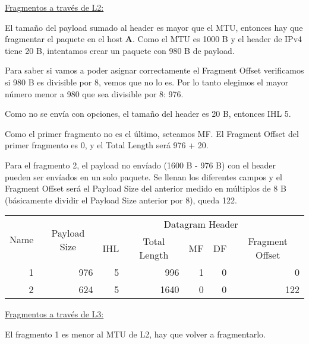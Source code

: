 \noindent
\underline{Fragmentos a través de L2:}

\vspace{\baselineskip}
El tamaño del payload sumado al header es mayor que el MTU, entonces hay que fragmentar el paquete en el host \textbf{A}. Como el MTU es 1000 B y el header de IPv4 tiene 20 B, intentamos crear un paquete con 980 B de payload.

Para saber si vamos a poder asignar correctamente el Fragment Offset verificamos si 980 B es divisible por 8, vemos que no lo es. Por lo tanto elegimos el mayor número menor a 980 que sea divisible por 8: 976.

Como no se envía con opciones, el tamaño del header es 20 B, entonces IHL 5.

Como el primer fragmento no es el último, seteamos MF. El Fragment Offset del primer fragmento es 0, y el Total Length será 976 + 20.

Para el fragmento 2, el payload no envíado (1600 B - 976 B) con el header pueden ser envíados en un solo paquete. Se llenan los diferentes campos y el Fragment Offset será el Payload Size del anterior medido en múltiplos de 8 B (básicamente dividir el Payload Size anterior por 8), queda 122.


\begin{table}[H]
    \renewcommand{\arraystretch}{1.5}
    \centering
    \begin{tabular}{|c|c|crrrr|}
    \hline
    \multirow{2}{*}{Name} & \multirow{2}{*}{Payload Size} & \multicolumn{5}{c|}{Datagram Header} \\ \cline{3-7} 
        &  & \multicolumn{1}{c|}{IHL} & \multicolumn{1}{c|}{Total Length} & \multicolumn{1}{c|}{MF} & \multicolumn{1}{c|}{DF} & \multicolumn{1}{c|}{Fragment Offset} \\ \hline
    \multicolumn{1}{|r|}{1} & \multicolumn{1}{r|}{976} & \multicolumn{1}{r|}{5} & \multicolumn{1}{r|}{996} & \multicolumn{1}{r|}{1} & \multicolumn{1}{r|}{0} & 0 \\ \hline
    \multicolumn{1}{|r|}{2} & \multicolumn{1}{r|}{624} & \multicolumn{1}{r|}{5} & \multicolumn{1}{r|}{1640} & \multicolumn{1}{r|}{0} & \multicolumn{1}{r|}{0} & 122 \\ \hline
    \end{tabular}
\end{table}


\noindent
\underline{Fragmentos a través de L3:}

\vspace{\baselineskip}
El fragmento 1 es menor al MTU de L2, hay que volver a fragmentarlo.

